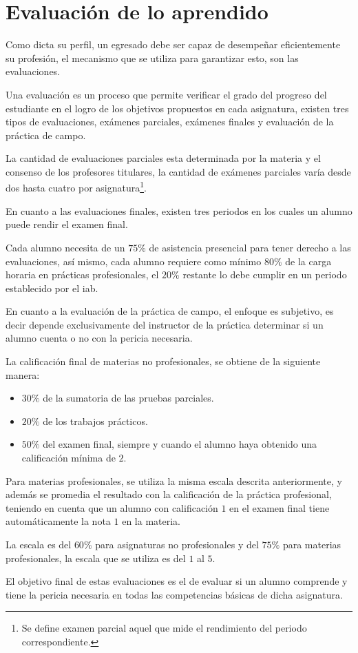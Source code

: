 \section{Evaluación de lo aprendido}
\label{sec:problema_evaluacion}

Como dicta su perfil, un egresado debe ser capaz de desempeñar eficientemente su
profesión, el mecanismo que se utiliza para garantizar esto, son las
evaluaciones.

Una evaluación es un proceso que permite verificar el grado del progreso del
estudiante en el logro de los objetivos propuestos en cada
asignatura\cite{iab:est_enfemeria}, existen tres tipos de evaluaciones, exámenes
parciales, exámenes finales y evaluación de la práctica de campo.

La cantidad de evaluaciones parciales esta determinada por la materia y el
consenso de los profesores titulares\cite{iab:est_enfemeria}, la cantidad de
exámenes parciales varía desde dos hasta cuatro por asignatura\footnote{Se
    define examen parcial aquel que mide el rendimiento del periodo
    correspondiente\cite{iab:est_enfemeria}.}.

En cuanto a las evaluaciones finales, existen tres periodos en los cuales un
alumno puede rendir el examen final.

Cada alumno necesita de un $75\%$ de asistencia presencial para tener derecho a
las evaluaciones, así mismo, cada alumno requiere como mínimo $80\%$ de la carga
horaria en prácticas profesionales, el $20\%$ restante lo debe cumplir en un
periodo establecido por el \Gls{iab}.

En cuanto a la evaluación de la práctica de campo, el enfoque es subjetivo, es
decir depende exclusivamente del instructor de la práctica determinar si un
alumno cuenta o no con la pericia necesaria.

La calificación final de materias no profesionales, se obtiene de la siguiente
manera\cite{iab:est_enfemeria}:

\begin{itemize}
    \item $30\%$ de la sumatoria de las pruebas parciales.
    \item $20\%$ de los trabajos prácticos.
    \item $50\%$ del examen final, siempre y cuando el alumno haya obtenido
        una calificación mínima de $2$.
\end{itemize}

Para materias profesionales, se utiliza la misma escala descrita anteriormente,
y además se promedia el resultado con la calificación de la práctica
profesional\cite{iab:est_enfemeria}, teniendo en cuenta que un alumno con
calificación $1$ en el examen final tiene automáticamente la nota $1$ en la
materia\cite{iab:est_enfemeria}.

La escala es del $60\%$ para asignaturas no profesionales y del $75\%$ para
materias profesionales, la escala que se utiliza es del $1$ al $5$.

El objetivo final de estas evaluaciones es el de evaluar si un alumno comprende
y tiene la pericia necesaria en todas las competencias básicas de dicha
asignatura.
